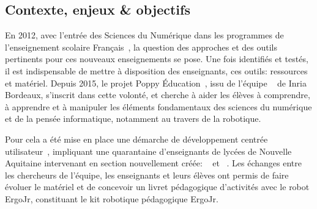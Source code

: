 \subsection*{Contexte, enjeux \& objectifs}
    En 2012, avec l’entrée des Sciences du Numérique dans les programmes de l’enseignement scolaire Français~, la question des approches et des outils pertinents pour ces nouveaux enseignements se pose. Une fois identifiés et testés, il est indispensable de mettre à disposition des enseignants, ces outils: ressources et matériel. 
    Depuis 2015, le projet Poppy Éducation~, issu de l'équipe ~ de Inria Bordeaux, s’inscrit dans cette volonté, et cherche à aider les élèves à comprendre, à apprendre et à manipuler les éléments fondamentaux des sciences du numérique et de la pensée informatique, notamment au travers de la robotique.\par%
    Pour cela a été mise en place une démarche de développement centrée utilisateur~, impliquant une quarantaine d’enseignants de lycées de Nouvelle Aquitaine intervenant en section nouvellement créée: ~ et ~.
    Les échanges entre les chercheurs de l’équipe, les enseignants et leurs élèves ont permis de faire évoluer le matériel et de concevoir un livret pédagogique d’activités avec le robot ErgoJr, constituant le kit robotique pédagogique ErgoJr.
